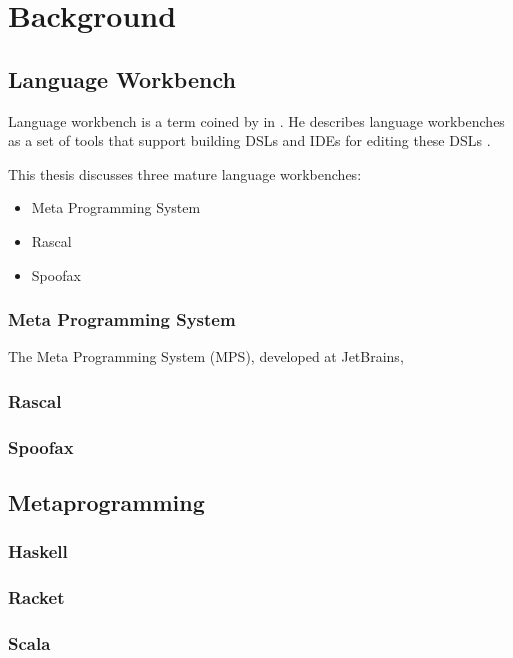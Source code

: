 \chapter{Background}

\section{Language Workbench}

Language workbench is a term coined by \citeauthor{fowler2005language} in \citeyear{fowler2005language} \cite{fowler2005language}.
He describes language workbenches as a set of tools that support building DSLs and IDEs for editing these DSLs \cite{fowler2010domain}.

This thesis discusses three mature language workbenches:
\begin{itemize}
	\item Meta Programming System
	\item Rascal
	\item Spoofax
\end{itemize}

\subsection{Meta Programming System}
The Meta Programming System (MPS), developed at JetBrains, \citeauthor{pech2013jetbrains}

\subsection{Rascal}

\subsection{Spoofax}

\section{Metaprogramming}

\subsection{Haskell}

\subsection{Racket}

\subsection{Scala}
